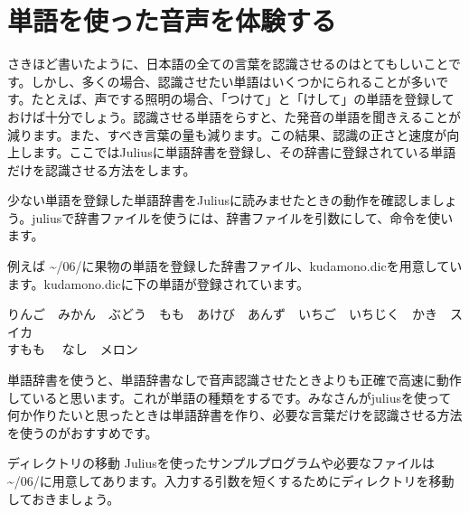 \newpage
\section{単語を使った音声を体験する}
さきほど書いたように、日本語の全ての言葉を認識させるのはとてもしいことです。しかし、多くの場合、認識させたい単語はいくつかにられることが多いです。たとえば、声でする照明の場合、「つけて」と「けして」の単語を登録しておけば十分でしょう。認識させる単語をらすと、た発音の単語を聞きえることが減ります。また、すべき言葉の量も減ります。この結果、認識の正さと速度が向上します。ここではJuliusに単語辞書を登録し、その辞書に登録されている単語だけを認識させる方法をします。

少ない単語を登録した単語辞書をJuliusに読みませたときの動作を確認しましょう。juliusで辞書ファイルを使うには、辞書ファイルを引数にして、命令を使います。\\

例えば \textasciitilde /06/に果物の単語を登録した辞書ファイル、kudamono.dicを用意しています。kudamono.dicに下の単語が登録されています。
\begin{center}
	りんご　みかん　ぶどう　もも　あけび　あんず　いちご　いちじく　かき　スイカ\\すもも　	なし　メロン
\end{center}

単語辞書を使うと、単語辞書なしで音声認識させたときよりも正確で高速に動作していると思います。これが単語の種類をするです。みなさんがjuliusを使って何か作りたいと思ったときは単語辞書を作り、必要な言葉だけを認識させる方法を使うのがおすすめです。\\

\begin{itembox}[c]{ディレクトリの移動}
        Juliusを使ったサンプルプログラムや必要なファイルは \textasciitilde /06/に用意してあります。入力する引数を短くするためにディレクトリを移動しておきましょう。\\
\end{itembox}

\begin{tcolorbox}[title=\useOmetoi]
\begin{enumerate}
\end{enumerate}
\end{tcolorbox}

